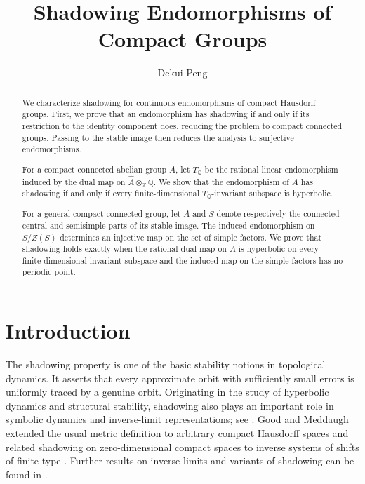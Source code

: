 \documentclass[12pt]{amsart}
\theoremstyle{definition}
\numberwithin{equation}{section}
\theoremstyle{remark}
\begin{document}
\title[Shadowing Endomorphisms]{Shadowing Endomorphisms of Compact Groups}

\author[D. Peng]{Dekui Peng}
 \address[D. Peng]
{Institute of Mathematics, Nanjing Normal University, Nanjing 210024, China}




\begin{abstract}
	We characterize shadowing for continuous endomorphisms of compact Hausdorff groups. First, we prove that an endomorphism has shadowing if and only if its restriction to the identity component does, reducing the problem to compact connected groups. Passing to the stable image then reduces the analysis to surjective endomorphisms.
	
	For a compact connected abelian group $A$, let $T_{\mathbb Q}$ be the rational linear endomorphism induced by the dual map on $\widehat A\otimes_{\mathbb Z}\mathbb Q$. We show that the endomorphism of $A$ has shadowing if and only if every finite-dimensional $T_{\mathbb Q}$-invariant subspace is hyperbolic.
	
	For a general compact connected group, let $A$ and $S$ denote respectively the connected central and semisimple parts of its stable image. The induced endomorphism on $S/Z(S)$ determines an injective map on the set of simple factors. We prove that shadowing holds exactly when the rational dual map on $A$ is hyperbolic on every finite-dimensional invariant subspace and the induced map on the simple factors has no periodic point.
\end{abstract}


\maketitle

\section{Introduction}

The shadowing property is one of the basic stability notions in topological
dynamics. It asserts that every approximate orbit with sufficiently small
errors is uniformly traced by a genuine orbit. Originating in the study of
hyperbolic dynamics and structural stability, shadowing also plays an
important role in symbolic dynamics and inverse-limit representations; see
\cite{AokiHomeo, AH, Kitchens, LM, Pilyugin, Walters}. Good and Meddaugh extended the usual metric
definition to arbitrary compact Hausdorff spaces and related shadowing on
zero-dimensional compact spaces to inverse systems of shifts of finite type
\cite{GM}. Further results on inverse limits and variants of shadowing can be
found in \cite{Bernardes,CL,GOP}.
\end{document}
